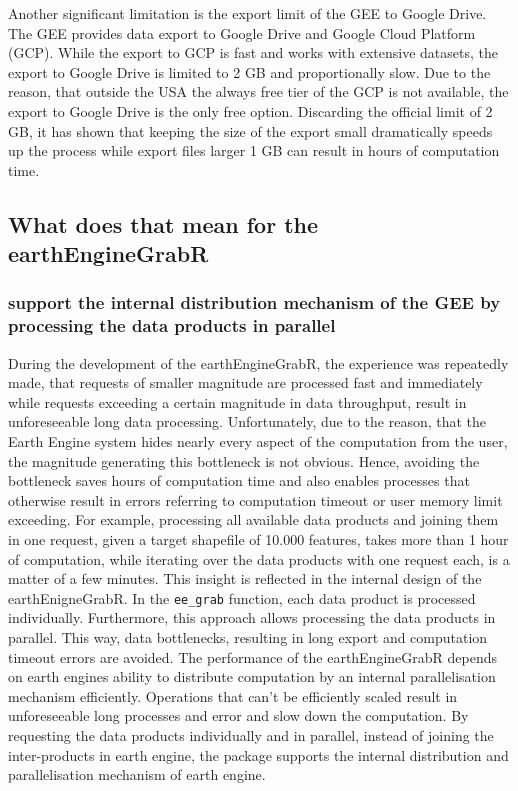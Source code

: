 Another significant limitation is the export limit of the GEE to Google Drive.
The GEE provides data export to Google Drive and Google Cloud Platform (GCP). While the export to GCP is fast and works with extensive datasets, the export to Google Drive is limited to 2 GB and proportionally slow. Due to the reason, that outside the USA the always free tier of the GCP is not available, the export to Google Drive is the only free option. Discarding the official limit of 2 GB, it has shown that keeping the size of the export small dramatically speeds up the process while export files larger 1 GB can result in hours of computation time. 

\subsection{What does that mean for the earthEngineGrabR}

\subsubsection{support the internal distribution mechanism of the GEE by processing the data products in parallel}

During the development of the earthEngineGrabR, the experience was repeatedly made, that requests of smaller magnitude are processed fast and immediately while requests exceeding a certain magnitude in data throughput, result in unforeseeable long data processing. Unfortunately, due to the reason, that the Earth Engine system hides nearly every aspect of the computation from the user, the magnitude generating this bottleneck is not obvious. Hence, avoiding the bottleneck saves hours of computation time and also enables processes that otherwise result in errors referring to computation timeout or user memory limit exceeding. For example, processing all available data products and joining them in one request, given a target shapefile of 10.000 features, takes more than 1 hour of computation, while iterating over the data products with one request each, is a matter of a few minutes. This insight is reflected in the internal design of the earthEnigneGrabR. In the \texttt{ee\_grab} function, each data product is processed individually. Furthermore, this approach allows processing the data products in parallel. This way, data bottlenecks, resulting in long export and computation timeout errors are avoided. The performance of the earthEngineGrabR depends on earth engines ability to distribute computation by an internal parallelisation mechanism efficiently. Operations that can't be efficiently scaled result in unforeseeable long processes and error and slow down the computation. By requesting the data products individually and in parallel, instead of joining the inter-products in earth engine, the package supports the internal distribution and parallelisation mechanism of earth engine.


